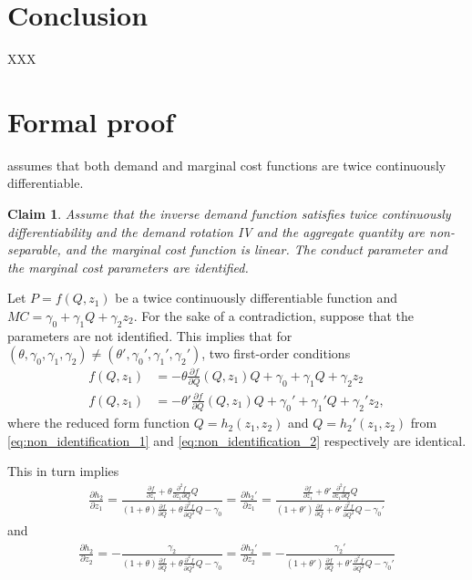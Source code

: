 \documentclass[11pt]{article}
\newtheorem{claim}{Claim}
\begin{document}
\section{Conclusion}

XXX

\appendix


\section{Formal proof}
\citet{lau1982identifying} assumes that both demand and marginal cost functions are twice continuously differentiable.

\begin{claim}
Assume that the inverse demand function satisfies twice continuously differentiability and the demand rotation IV and the aggregate quantity are non-separable, and the marginal cost function is linear. The conduct parameter and the marginal cost parameters are identified.
\end{claim}

Let $P = f(Q,z_1)$ be a twice continuously differentiable function and $MC = \gamma_0 + \gamma_1 Q + \gamma_2 z_2$.
For the sake of a contradiction, suppose that the parameters are not identified. This implies that for $(\theta, \gamma_0, \gamma_1, \gamma_2)\ne (\theta', \gamma_0', \gamma_1', \gamma_2')$, two first-order conditions
\begin{align}
    f(Q,z_1) &= - \theta \frac{\partial f}{\partial Q}(Q,z_1) Q + \gamma_0 + \gamma_1 Q + \gamma_2 z_2 \label{eq:non_identification_1}\\
    f(Q,z_1) &= - \theta' \frac{\partial f}{\partial Q}(Q,z_1) Q + \gamma_0' + \gamma_1' Q + \gamma_2' z_2 \label{eq:non_identification_2},
\end{align}
where the reduced form function $Q= h_2(z_1,z_2)$ and $Q= h_2'(z_1,z_2)$ from \eqref{eq:non_identification_1} and \eqref{eq:non_identification_2} respectively are identical.

This in turn implies
\begin{align}\label{eq:equivalence_1}
    \frac{\partial h_2}{\partial z_1} = \frac{\frac{\partial f}{\partial z_1} + \theta \frac{\partial^2 f}{\partial z_1\partial Q}Q}{(1 + \theta)\frac{\partial f}{\partial Q} + \theta \frac{\partial^2 f}{\partial Q^2}Q - \gamma_0} = \frac{\partial h_2'}{\partial z_1} = \frac{\frac{\partial f}{\partial z_1} + \theta' \frac{\partial^2 f}{\partial z_1\partial Q}Q}{(1 + \theta')\frac{\partial f}{\partial Q} + \theta' \frac{\partial^2 f}{\partial Q^2}Q - \gamma_0'}
\end{align}
and 
\begin{align}\label{eq:equivalence_2}
    \frac{\partial h_2}{\partial z_2} = -\frac{\gamma_2}{(1 + \theta)\frac{\partial f}{\partial Q} + \theta \frac{\partial^2 f}{\partial Q^2}Q - \gamma_0} = \frac{\partial h_2'}{\partial z_2} = -\frac{\gamma_2'}{(1 + \theta')\frac{\partial f}{\partial Q} + \theta' \frac{\partial^2 f}{\partial Q^2}Q - \gamma_0'}
\end{align}
\end{document}
